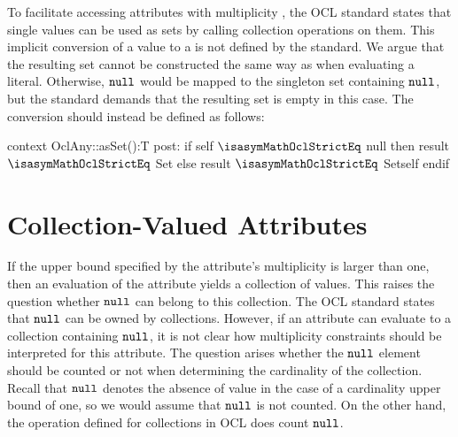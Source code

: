 To facilitate accessing attributes with multiplicity , the OCL
standard states that single values can be used as sets by calling collection
operations on them. This implicit conversion of a value to a
 is not defined by the standard. We argue that the resulting set
cannot be constructed the same way as when evaluating a 
literal. Otherwise, $\mathtt{null}$ would be mapped to the singleton set
containing $\mathtt{null}$, but the standard demands that
the resulting set is empty in this case. The conversion should instead
be defined as follows:
\begin{ocl}
context OclAny::asSet():T
  post: if self $\isasymMathOclStrictEq$ null then result $\isasymMathOclStrictEq$ Set{}
        else result $\isasymMathOclStrictEq$ Set{self} endif
\end{ocl}

\section{Collection-Valued Attributes}\label{sec:collection-valued-properties}
If the upper bound specified by the attribute's multiplicity is larger than one,
then an evaluation of the attribute yields a collection of values.  This raises
the question whether $\mathtt{null}$ can belong to this collection. The OCL
standard states that $\mathtt{null}$ can be owned by collections. However, if
an attribute can evaluate to a collection containing $\mathtt{null}$, it is not
clear how multiplicity constraints should be interpreted for this attribute. The
question arises whether the $\mathtt{null}$ element should be counted or not
when determining the cardinality of the collection. Recall that $\mathtt{null}$
denotes the absence of value in the case of a cardinality upper bound of one, so
we would assume that $\mathtt{null}$ is not counted. On the other hand, the
operation  defined for collections in OCL does count
$\mathtt{null}$.

